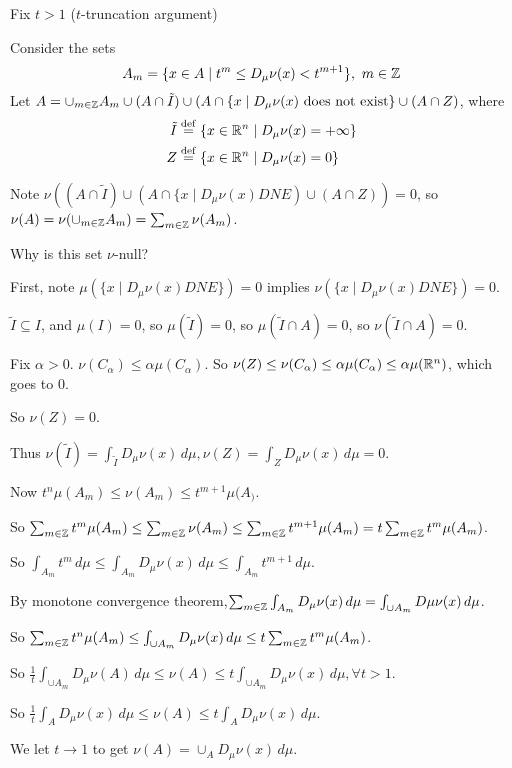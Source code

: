 \documentclass[x11names,reqno,14pt]{extarticle}
\newcommand{\Dmn}{D_\mu\nu}
\begin{document}
Fix $t > 1$ ($t$-truncation argument)

Consider the sets
\[
A_m = \{x\in A\mid t^m \leq D_\mu\nu(x) < t^{m + 1}\},\,\,m\in\mathbb{Z}
\]
Let $A = \cup_{m\in\mathbb{Z}}A_m \cup (A \cap \tilde{I}) \cup (A \cap \{x\mid D_\mu\nu(x) \text{ does not exist}\} \cup (A \cap Z)$, where 
\begin{align*}
\tilde{I} & \overset{\mathrm{def}}{=} \{x\in\mathbb{R}^n\mid D_\mu\nu(x) = +\infty\} \\
Z & \overset{\mathrm{def}}{=} \{x\in\mathbb{R}^n\mid D_\mu\nu(x) = 0\} \\
\end{align*}

Note $\nu((A \cap \tilde{I}) \cup (A \cap \{x\mid D_\mu\nu(x) DNE ) \cup (A \cap Z))= 0$, so $\nu(A) = \nu(\cup_{m\in\mathbb{Z}}A_m) = \sum_{m\in\mathbb{Z}}\nu(A_m)$.

Why is this set $\nu$-null? 

First, note $\mu(\{x\mid D_\mu\nu(x) DNE\}) = 0$ implies $\nu(\{x\mid D_\mu\nu(x) DNE\}) = 0$. 

$\tilde{I}\subseteq I$, and $\mu(I) = 0$, so $\mu(\tilde{I}) = 0$, so $\mu(\tilde{I} \cap A) = 0$, so $\nu(\tilde{I}\cap A) = 0$.

Fix $\alpha > 0$. $\nu(C_\alpha)\leq\alpha\mu(C_\alpha)$. So $\nu(Z)\leq\nu(C_\alpha)\leq\alpha\mu(C_\alpha)\leq\alpha\mu(\mathbb{R}^n)$, which goes to $0$. 

So $\nu(Z) = 0$. 

Thus $\nu(\tilde{I}) = \int_{\tilde{I}} D_\mu\nu(x)\,d\mu, \nu(Z) = \int_ZD_\mu\nu(x)\,d\mu = 0$.

Now $t^n\mu(A_m) \leq \nu(A_m) \leq t^{m + 1}\mu(A_)$. 

So $\sum_{m\in\mathbb{Z}}t^m\mu(A_m) \leq \sum_{m\in\mathbb{Z}}\nu(A_m) \leq \sum_{m\in\mathbb{Z}}t^{m + 1}\mu(A_m) =t \sum_{m\in\mathbb{Z}}t^m\mu(A_m)$. 


So $\int_{A_m}t^m\,d\mu \leq \int_{A_m}D_\mu\nu(x)\,d\mu \leq \int_{A_m}t^{m + 1}\,d\mu$. 

By monotone convergence theorem,$\sum_{m\in\mathbb{Z}}\int_{A_m}D_\mu\nu(x)\,d\mu = \int_{\cup A_m}D\mu\nu(x)\,d\mu$. 

So $\sum_{m\in\Z}t^n\mu(A_m) \leq \int_{\cup A_m}\Dmn(x)\,d\mu \leq t\sum_{m\in\Z}t^m\mu(A_m)$. 

So $\frac{1}{t}\int_{\cup A_m}\Dmn(A)\,d\mu \leq \nu(A) \leq t\int_{\cup A_m}\Dmn(x)\,d\mu, \forall t > 1$. 

So $\frac{1}{t}\int_A\Dmn(x)\,d\mu \leq \nu(A) \leq t \int_{A}\Dmn(x)\,d\mu$. 

We let $t\to 1$ to get $\nu(A) = \cup_A\Dmn(x)\,d\mu$. 
\end{document}

